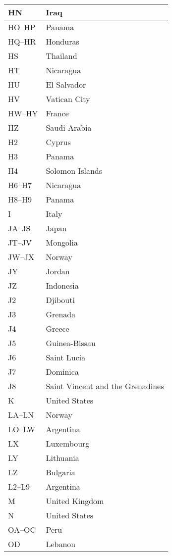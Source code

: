 \begin{longtable}{|l|l|}
	\hline
	HN & Iraq \\
	\hline
	HO--HP & Panama \\
	\hline
	HQ--HR & Honduras \\
	\hline
	HS & Thailand \\
	\hline
	HT & Nicaragua \\
	\hline
	HU & El Salvador \\
	\hline
	HV & Vatican City \\
	\hline
	HW--HY & France \\
	\hline
	HZ & Saudi Arabia \\
	\hline
	H2 & Cyprus \\
	\hline
	H3 & Panama \\
	\hline
	H4 & Solomon Islands \\
	\hline
	H6--H7 & Nicaragua \\
	\hline
	H8--H9 & Panama \\
	\hline
	I & Italy \\
	\hline
	JA--JS & Japan \\
	\hline
	JT--JV & Mongolia \\
	\hline
	JW--JX & Norway \\
	\hline
	JY & Jordan \\
	\hline
	JZ & Indonesia \\
	\hline
	J2 & Djibouti \\
	\hline
	J3 & Grenada \\
	\hline
	J4 & Greece \\
	\hline
	J5 & Guinea-Bissau \\
	\hline
	J6 & Saint Lucia \\
	\hline
	J7 & Dominica \\
	\hline
	J8 & Saint Vincent and the Grenadines \\
	\hline
	K & United States \\
	\hline
	LA--LN & Norway \\
	\hline
	LO--LW & Argentina \\
	\hline
	LX & Luxembourg \\
	\hline
	LY & Lithuania \\
	\hline
	LZ & Bulgaria \\
	\hline
	L2--L9 & Argentina \\
	\hline
	M & United Kingdom \\
	\hline
	N & United States \\
	\hline
	OA--OC & Peru \\
	\hline
	OD & Lebanon \\
	\hline

\end{longtable}
